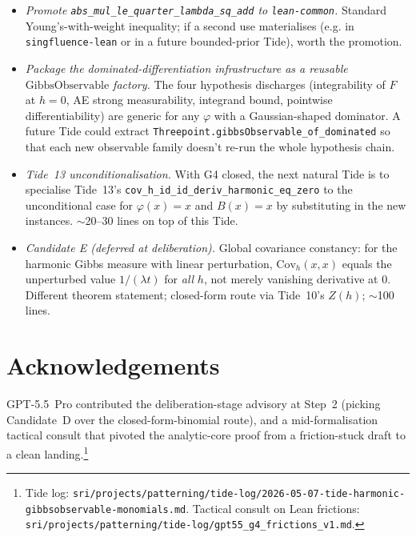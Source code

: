 \documentclass[11pt]{article}
\newcommand{\GO}{\mathrm{GibbsObservable}}
\begin{document}
\begin{itemize}
\item \emph{Promote \texttt{abs\_mul\_le\_quarter\_lambda\_sq\_add} to
\texttt{lean-common}.} Standard Young's-with-weight inequality; if a
second use materialises (e.g. in \texttt{singfluence-lean} or in a
future bounded-prior Tide), worth the promotion.

\item \emph{Package the dominated-differentiation infrastructure as a
reusable \(\GO\) factory.} The four hypothesis discharges
(integrability of \(F\) at \(h=0\), AE strong measurability,
integrand bound, pointwise differentiability) are generic for any
\(\varphi\) with a Gaussian-shaped dominator. A future Tide could
extract \texttt{Threepoint.gibbsObservable\_of\_dominated} so that
each new observable family doesn't re-run the whole hypothesis chain.

\item \emph{Tide~13 unconditionalisation.} With G4 closed, the next
natural Tide is to specialise Tide~13's
\texttt{cov\_h\_id\_id\_deriv\_harmonic\_eq\_zero} to the
unconditional case for \(\varphi(x) = x\) and \(B(x) = x\) by
substituting in the new instances. \(\sim\)20--30 lines on top of
this Tide.

\item \emph{Candidate E (deferred at deliberation).} Global
covariance constancy: for the harmonic Gibbs measure with linear
perturbation, \(\mathrm{Cov}_h(x, x)\) equals the unperturbed value
\(1/(\lambda t)\) for \emph{all} \(h\), not merely vanishing
derivative at \(0\). Different theorem statement; closed-form route
via Tide~10's \(Z(h)\); \(\sim\)100 lines.
\end{itemize}

\section*{Acknowledgements}

GPT-5.5~Pro contributed the deliberation-stage advisory at Step~2
(picking Candidate~D over the closed-form-binomial route), and a
mid-formalisation tactical consult that pivoted the analytic-core
proof from a friction-stuck draft to a clean
landing.\footnote{Tide log:
\texttt{sri/projects/patterning/tide-log/2026-05-07-tide-harmonic-gibbsobservable-monomials.md}.
Tactical consult on Lean frictions:
\texttt{sri/projects/patterning/tide-log/gpt55\_g4\_frictions\_v1.md}.}
\end{document}
